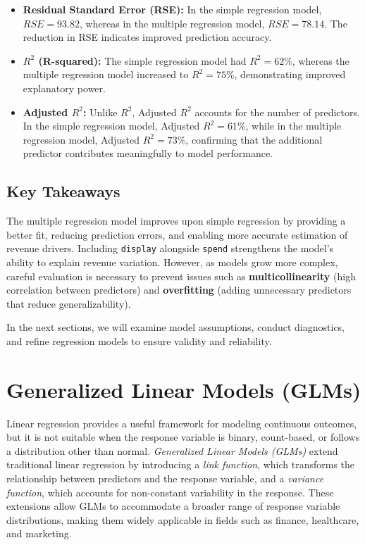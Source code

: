 \documentclass[
  11pt,
]{book}
\theoremstyle{definition}
\theoremstyle{definition}
\theoremstyle{definition}
\theoremstyle{definition}
\theoremstyle{remark}
\begin{document}
\begin{itemize}
\item
  \textbf{Residual Standard Error (RSE):} In the simple regression model, \(RSE = 93.82\), whereas in the multiple regression model, \(RSE = 78.14\). The reduction in RSE indicates improved prediction accuracy.
\item
  \textbf{\(R^2\) (R-squared):} The simple regression model had \(R^2 = 62\%\), whereas the multiple regression model increased to \(R^2 = 75\%\), demonstrating improved explanatory power.
\item
  \textbf{Adjusted \(R^2\):} Unlike \(R^2\), Adjusted \(R^2\) accounts for the number of predictors. In the simple regression model, Adjusted \(R^2 = 61\%\), while in the multiple regression model, Adjusted \(R^2 = 73\%\), confirming that the additional predictor contributes meaningfully to model performance.
\end{itemize}

\subsection*{Key Takeaways}\label{key-takeaways-2}


The multiple regression model improves upon simple regression by providing a better fit, reducing prediction errors, and enabling more accurate estimation of revenue drivers. Including \texttt{display} alongside \texttt{spend} strengthens the model's ability to explain revenue variation. However, as models grow more complex, careful evaluation is necessary to prevent issues such as \textbf{multicollinearity} (high correlation between predictors) and \textbf{overfitting} (adding unnecessary predictors that reduce generalizability).

In the next sections, we will examine model assumptions, conduct diagnostics, and refine regression models to ensure validity and reliability.

\section{Generalized Linear Models (GLMs)}\label{generalized-linear-models-glms}

Linear regression provides a useful framework for modeling continuous outcomes, but it is not suitable when the response variable is binary, count-based, or follows a distribution other than normal. \emph{Generalized Linear Models (GLMs)} extend traditional linear regression by introducing a \emph{link function}, which transforms the relationship between predictors and the response variable, and a \emph{variance function}, which accounts for non-constant variability in the response. These extensions allow GLMs to accommodate a broader range of response variable distributions, making them widely applicable in fields such as finance, healthcare, and marketing.
\end{document}
